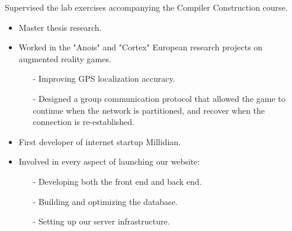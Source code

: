 \documentclass[10pt,a4paper]{../altacv}
\begin{document}
\medskip

Supervised the lab exercises accompanying the Compiler Construction course.

\medskip



\newpage
\medskip\medskip{}

\begin{itemize}
\item Master thesis research.
\item Worked in the "Anois" and "Cortex" European research projects on augmented reality games.
	\begin{itemize}
	\item[-] Improving GPS localization accuracy.
	\item[-] Designed a group communication protocol that allowed the game to continue when the network is partitioned, and recover when the connection is re-established.
	\end{itemize}
\end{itemize}

\medskip





\medskip\medskip{}

\begin{itemize}
\item First developer of internet startup Millidian.
\item Involved in every aspect of launching our website:
	\begin{itemize}
	\item[-] Developing both the front end and back end.
	\item[-] Building and optimizing the database.
	\item[-] Setting up our server infrastructure.
	\end{itemize}
\end{itemize}

\medskip




\medskip\medskip{}
\end{document}
